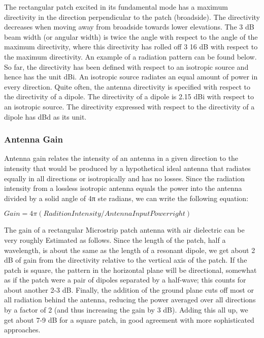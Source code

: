 \documentclass[12pt]{article}
\begin{document}
         The rectangular patch excited in its fundamental mode has a maximum directivity in the direction perpendicular to the patch (broadside). The directivity decreases when moving away from broadside towards lower elevations. The 3 dB beam width (or angular width) is twice the angle with respect to the angle of the maximum directivity, where this directivity has rolled off 3 16 dB with respect to the maximum directivity. An example of a radiation pattern can be found below. So far, the directivity has been defined with respect to an isotropic source and hence has the unit dBi. An isotropic source radiates an equal amount of power in every direction. Quite often, the antenna directivity is specified with respect to the directivity of a dipole. The  directivity of a dipole is 2.15 dBi with respect to an isotropic source. The directivity expressed with respect to the directivity of a dipole has dBd as its unit.

        \subsubsection{Antenna Gain}
         \justify
         
	        Antenna gain relates the intensity of an antenna in a given direction to the intensity that would be produced by a hypothetical ideal antenna that radiates equally in all directions or isotropically and has no losses. Since the radiation intensity from a lossless isotropic antenna equals the power into the antenna divided by a solid angle of 4π ste radians, we can write the following equation:\newline \newline	        
	       
	        $ Gain= 4 \pi (Radition Intensity / Antenna InputPower right ) $
			\newline \newline
	        
	        The gain of a rectangular Microstrip patch antenna with air dielectric can be very roughly Estimated as follows. Since the length of the patch, half a wavelength, is about the same as the length of a resonant dipole, we get about 2 dB of gain from the directivity relative to the vertical axis of the patch. If the patch is square, the pattern in the horizontal plane will be directional, somewhat as if the patch were a pair of dipoles separated by a half-wave; this counts for about another 2-3 dB. Finally, the addition of the ground plane cuts off most or all radiation behind the antenna, reducing the power averaged over all directions by a factor of 2 (and thus increasing the gain by 3 dB). Adding this all up, we get about 7-9 dB for a square patch, in good agreement with more sophisticated approaches.
\end{document}
